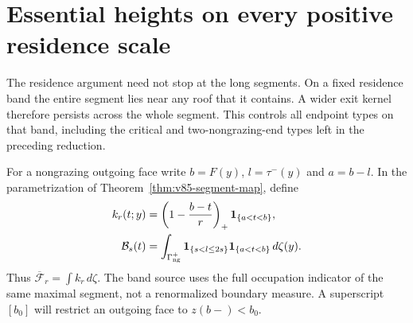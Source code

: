 \section{Essential heights on every positive residence scale}
\label{sec:v85-bands}
The residence argument need not stop at the long segments. On a fixed
residence band the entire segment lies near any roof that it contains.
A wider exit kernel therefore persists across the whole segment. This
controls all endpoint types on that band, including the critical and
two-nongrazing-end types left in the preceding reduction.

For a nongrazing outgoing face write $b=F(y)$, $l=\tau^-(y)$ and
$a=b-l$. In the parametrization of Theorem~\ref{thm:v85-segment-map},
define
\begin{align}
 k_r(t;y)&=\left(1-\frac{b-t}{r}\right)_+
                                    \one_{\{a<t<b\}},\notag\\
 \mathcal B_s(t)&=\int_{\Gamma_{\rm ng}^+}
          \one_{\{s<l\le2s\}}\one_{\{a<t<b\}}\,d\zeta(y).
                                             \label{eq:v85-band-source}
\end{align}
Thus $\overline{\mathcal F}_r=\int k_r\,d\zeta$. The band source
uses the full occupation indicator of the same maximal segment, not a
renormalized boundary measure. A superscript $[b_0]$ will restrict an
outgoing face to $z(b-)<b_0$.

